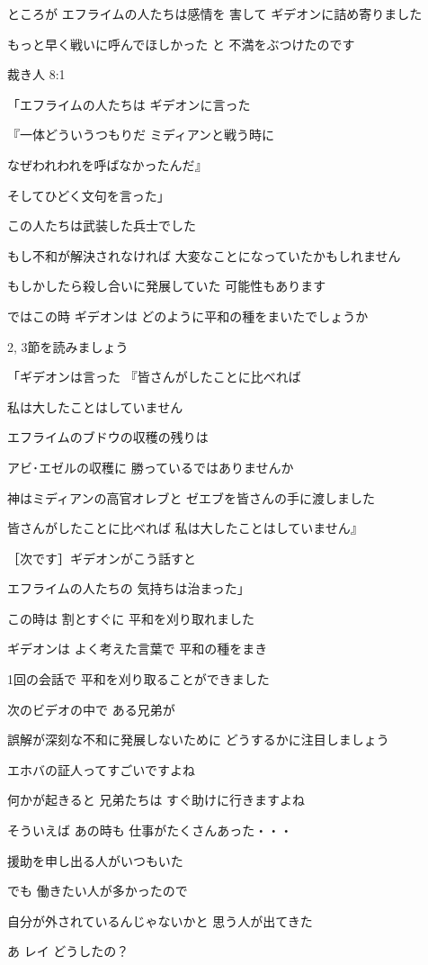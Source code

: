 \documentclass[twocolumn]{jsarticle}
\begin{document}
ところが エフライムの人たちは感情を
害して ギデオンに詰め寄りました

もっと早く戦いに呼んでほしかった と
不満をぶつけたのです

裁き人 8:1

「エフライムの人たちは
ギデオンに言った

『一体どういうつもりだ
ミディアンと戦う時に

なぜわれわれを呼ばなかったんだ』

そしてひどく文句を言った」

この人たちは武装した兵士でした

もし不和が解決されなければ
大変なことになっていたかもしれません

もしかしたら殺し合いに発展していた
可能性もあります

ではこの時 ギデオンは
どのように平和の種をまいたでしょうか

2, 3節を読みましょう

「ギデオンは言った
『皆さんがしたことに比べれば

私は大したことはしていません

エフライムのブドウの収穫の残りは

アビ･エゼルの収穫に
勝っているではありませんか

神はミディアンの高官オレブと
ゼエブを皆さんの手に渡しました

皆さんがしたことに比べれば
私は大したことはしていません』

［次です］ギデオンがこう話すと

エフライムの人たちの
気持ちは治まった」

この時は 割とすぐに
平和を刈り取れました

ギデオンは よく考えた言葉で
平和の種をまき

1回の会話で
平和を刈り取ることができました

次のビデオの中で ある兄弟が

誤解が深刻な不和に発展しないために
どうするかに注目しましょう

エホバの証人ってすごいですよね

何かが起きると 兄弟たちは
すぐ助けに行きますよね

そういえば あの時も
仕事がたくさんあった・・・

援助を申し出る人がいつもいた

でも 働きたい人が多かったので

自分が外されているんじゃないかと
思う人が出てきた

あ レイ どうしたの？
\end{document}
